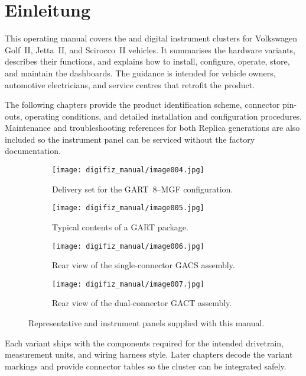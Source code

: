 \chapter{Einleitung}\label{ch:introduction}

This operating manual covers the \ReplicaGenOne{} and \ReplicaNextLong{} digital instrument clusters for Volkswagen Golf~II, Jetta~II, and Scirocco~II vehicles. It summarises the hardware variants, describes their functions, and explains how to install, configure, operate, store, and maintain the dashboards. The guidance is intended for vehicle owners, automotive electricians, and service centres that retrofit the product.

The following chapters provide the product identification scheme, connector pin-outs, operating conditions, and detailed installation and configuration procedures. Maintenance and troubleshooting references for both Replica generations are also included so the instrument panel can be serviced without the factory documentation.

\begin{figure}[htbp]
    \centering
    \begin{subfigure}{0.48\textwidth}
        \texttt{[image: digifiz\_manual/image004.jpg]}
        \caption{Delivery set for the GART~8--MGF configuration.}
    \end{subfigure}\hfill
    \begin{subfigure}{0.48\textwidth}
        \texttt{[image: digifiz\_manual/image005.jpg]}
        \caption{Typical contents of a GART package.}
    \end{subfigure}
    \begin{subfigure}{0.48\textwidth}
        \texttt{[image: digifiz\_manual/image006.jpg]}
        \caption{Rear view of the single-connector GACS assembly.}
    \end{subfigure}\hfill
    \begin{subfigure}{0.48\textwidth}
        \texttt{[image: digifiz\_manual/image007.jpg]}
        \caption{Rear view of the dual-connector GACT assembly.}
    \end{subfigure}
    \caption{Representative \ReplicaGenOne{} and \ReplicaNextLong{} instrument panels supplied with this manual.}
\end{figure}

Each variant ships with the components required for the intended drivetrain, measurement units, and wiring harness style. Later chapters decode the variant markings and provide connector tables so the cluster can be integrated safely.
